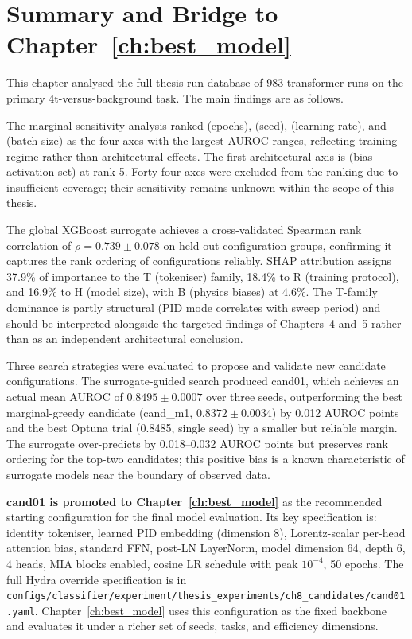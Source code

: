 \section{Summary and Bridge to Chapter~\ref{ch:best_model}}
\label{sec:ch8_summary}

This chapter analysed the full thesis run database of 983 transformer runs
on the primary 4t-versus-background task. The main findings are as follows.

The marginal sensitivity analysis ranked  (epochs),
 (seed),  (learning rate), and 
(batch size) as the four axes with the largest AUROC ranges, reflecting
training-regime rather than architectural effects. The first architectural
axis is  (bias activation set) at rank 5. Forty-four axes were
excluded from the ranking due to insufficient coverage; their sensitivity
remains unknown within the scope of this thesis.

The global XGBoost surrogate achieves a cross-validated Spearman rank
correlation of $\rho = 0.739 \pm 0.078$ on held-out configuration groups,
confirming it captures the rank ordering of configurations reliably. SHAP
attribution assigns 37.9\% of importance to the T (tokeniser) family, 18.4\%
to R (training protocol), and 16.9\% to H (model size), with B (physics biases)
at 4.6\%. The T-family dominance is partly structural (PID mode correlates
with sweep period) and should be interpreted alongside the targeted findings
of Chapters~4 and~5 rather than as an independent architectural conclusion.

Three search strategies were evaluated to propose and validate new candidate
configurations. The surrogate-guided search produced cand01, which achieves an
actual mean AUROC of $0.8495 \pm 0.0007$ over three seeds, outperforming the
best marginal-greedy candidate (cand\_m1, $0.8372 \pm 0.0034$) by 0.012 AUROC
points and the best Optuna trial (0.8485, single seed) by a smaller but reliable
margin. The surrogate over-predicts by 0.018--0.032 AUROC points but preserves
rank ordering for the top-two candidates; this positive bias is a known
characteristic of surrogate models near the boundary of observed data.

\textbf{cand01 is promoted to Chapter~\ref{ch:best_model}} as the recommended
starting configuration for the final model evaluation. Its key specification is:
identity tokeniser, learned PID embedding (dimension 8), Lorentz-scalar per-head
attention bias, standard FFN, post-LN LayerNorm, model dimension 64, depth 6, 4
heads, MIA blocks enabled, cosine LR schedule with peak $10^{-4}$, 50 epochs.
The full Hydra override specification is in
\texttt{configs/classifier/experiment/thesis\_experiments/ch8\_candidates/cand01.yaml}.
Chapter~\ref{ch:best_model} uses this configuration as the fixed backbone and
evaluates it under a richer set of seeds, tasks, and efficiency dimensions.
